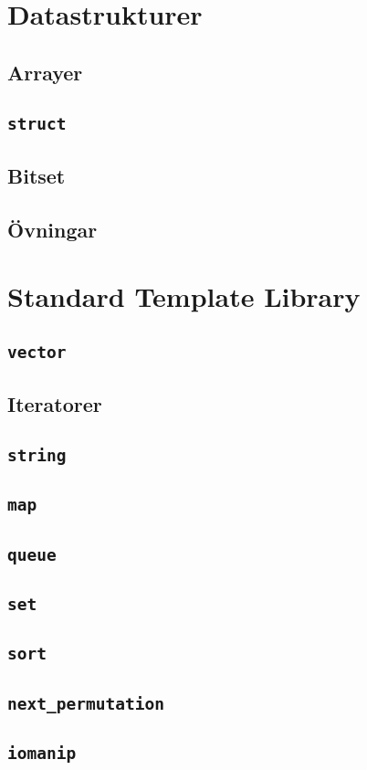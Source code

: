 \documentclass[10pt,a4paper]{article}
\theoremstyle{problem}
\begin{document}
\section{Datastrukturer}
\subsection{Arrayer}

\subsection{\texttt{struct}}

\subsection{Bitset}
\subsection{Övningar}


\section{Standard Template Library}
\subsection{\texttt{vector}}
\subsection{Iteratorer}
\subsection{\texttt{string}}
\subsection{\texttt{map}}
\subsection{\texttt{queue}}
\subsection{\texttt{set}}
\subsection{\texttt{sort}}
\subsection{\texttt{next\_permutation}}
\subsection{\texttt{iomanip}}

\end{document}
